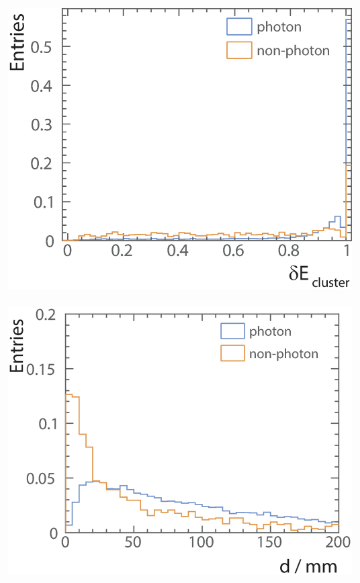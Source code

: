 \begin{figure}[tbph]
\begin{subfigure}[b]{0.45\textwidth}
    \includegraphics[width=\textwidth]{photon/likelihood/PeakEnergyFraction2}
    \caption{}
    \label{fig:photonMinDistanceToTrack}
  \end{subfigure}
  \begin{subfigure}[b]{0.45\textwidth}
    \includegraphics[width=\textwidth]{photon/likelihood/MinDistanceToTrack2}
    \caption{}
    \label{fig:photonMinDistanceToTrack}
  \end{subfigure}


\end{figure}
